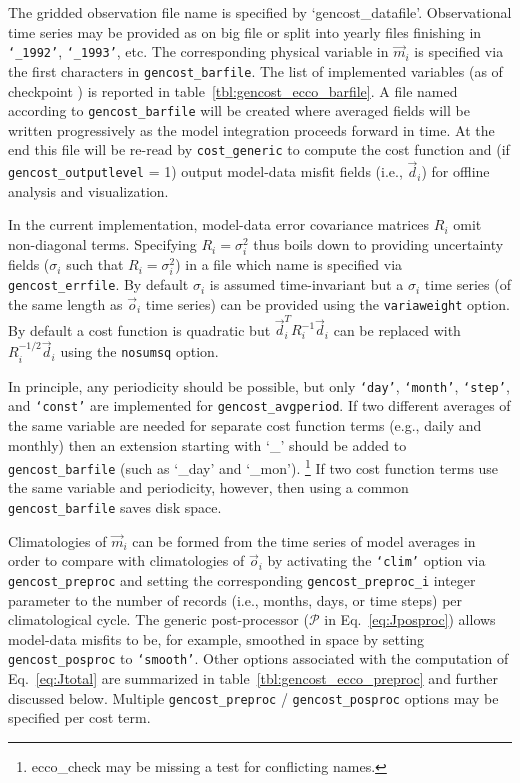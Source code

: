  \noindent
The gridded observation file name is specified by `gencost\_datafile'. Observational time series may be provided as on big file or split into yearly files finishing in \texttt{`\_1992'}, \texttt{`\_1993'}, etc. The corresponding physical variable in $\vec{m}_i$ is specified via the first characters in \texttt{gencost\_barfile}. The list of implemented variables (as of checkpoint \mitgcmCheckpointVersion) is reported in table~\ref{tbl:gencost_ecco_barfile}. A file named according to \texttt{gencost\_barfile} will be created where averaged fields will be written progressively as the model integration proceeds forward in time. At the end this file will be re-read by \texttt{cost\_generic} to compute the cost function and (if \texttt{gencost\_outputlevel} = 1) output model-data misfit fields (i.e., $\vec{d}_i$) for offline analysis and visualization.

In the current implementation, model-data error covariance matrices $R_i$ omit non-diagonal terms. Specifying $R_i=\sigma_i^2$ thus boils down to providing uncertainty fields ($\sigma_i$ such that $R_i=\sigma_i^2$) in a file which name is specified via \texttt{gencost\_errfile}. By default $\sigma_i$ is assumed time-invariant but a $\sigma_i$ time series (of the same length as $\vec{o}_i$ time series) can be provided using the \texttt{variaweight} option. By default a cost function is quadratic but $\vec{d}_i^T R_i^{-1} \vec{d}_i$ can be replaced with $R_i^{-1/2} \vec{d}_i$ using the \texttt{nosumsq} option. 

In principle, any periodicity should be possible, but only \texttt{`day'}, \texttt{`month'}, \texttt{`step'}, and \texttt{`const'} are implemented for \texttt{gencost\_avgperiod}. If two different averages of the same variable are needed for separate cost function terms (e.g., daily and monthly) then an extension starting with `\_' should be added to \texttt{gencost\_barfile} (such as `\_day' and `\_mon').
\footnote{ecco\_check may be missing a test for conflicting names.} If two cost function terms use the same variable and periodicity, however, then using a common \texttt{gencost\_barfile} saves disk space. 

Climatologies of $\vec{m}_i$ can be formed from the time series of model averages in order to compare with climatologies of $\vec{o}_i$ by activating the \texttt{`clim'} option via \texttt{gencost\_preproc} and setting the corresponding \texttt{gencost\_preproc\_i}  integer parameter to the number of records (i.e., months, days, or time steps) per climatological cycle. The generic post-processor ($\mathcal{P}$ in Eq.~\eqref{eq:Jposproc}) allows model-data misfits to be, for example, smoothed in space by setting \texttt{gencost\_posproc} to \texttt{`smooth'}. Other options associated with the computation of Eq.~\eqref{eq:Jtotal} are summarized in table~\ref{tbl:gencost_ecco_preproc} and further discussed below. Multiple \texttt{gencost\_preproc} / \texttt{gencost\_posproc} options may be specified per cost term. 

